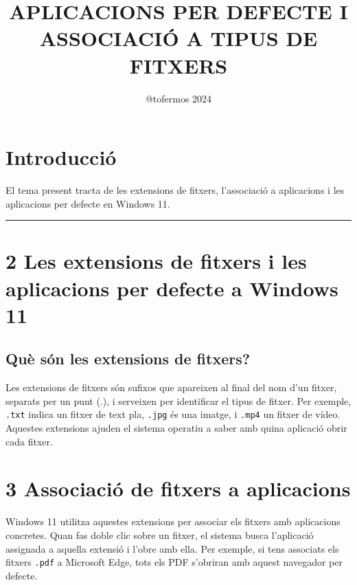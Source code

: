 \documentclass[
  a4paper,
]{article}
\title{APLICACIONS PER DEFECTE I ASSOCIACIÓ A TIPUS DE FITXERS}
\author{@tofermos 2024}
\date{}
\begin{document}
\maketitle

{
\setcounter{tocdepth}{2}
\tableofcontents
}
\newpage

\renewcommand\tablename{Tabla}

\section{Introducció}\label{introducciuxf3}

El tema present tracta de les extensions de fitxers, l'associació a
aplicacions i les aplicacions per defecte en Windows 11.

\begin{center}\rule{0.5\linewidth}{0.5pt}\end{center}

\section{2 Les extensions de fitxers i les aplicacions per defecte a
Windows
11}\label{les-extensions-de-fitxers-i-les-aplicacions-per-defecte-a-windows-11}

\subsection{Què són les extensions de
fitxers?}\label{quuxe8-suxf3n-les-extensions-de-fitxers}

Les extensions de fitxers són sufixos que apareixen al final del nom
d'un fitxer, separats per un punt (.), i serveixen per identificar el
tipus de fitxer. Per exemple, \texttt{.txt} indica un fitxer de text
pla, \texttt{.jpg} és una imatge, i \texttt{.mp4} un fitxer de vídeo.
Aquestes extensions ajuden el sistema operatiu a saber amb quina
aplicació obrir cada fitxer.

\section{3 Associació de fitxers a
aplicacions}\label{associaciuxf3-de-fitxers-a-aplicacions}

Windows 11 utilitza aquestes extensions per associar els fitxers amb
aplicacions concretes. Quan fas doble clic sobre un fitxer, el sistema
busca l'aplicació assignada a aquella extensió i l'obre amb ella. Per
exemple, si tens associats els fitxers \texttt{.pdf} a Microsoft Edge,
tots els PDF s'obriran amb aquest navegador per defecte.
\end{document}
